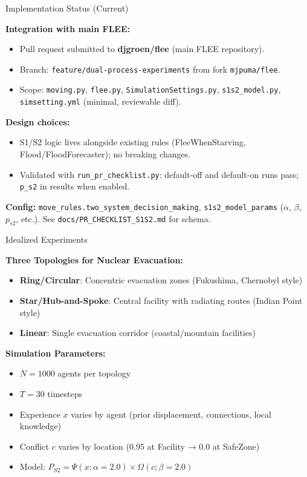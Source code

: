 \documentclass[aspectratio=169]{beamer}
\begin{document}
\begin{frame}{Implementation Status (Current)}

\textbf{Integration with main FLEE:}
\begin{itemize}
    \item Pull request submitted to \textbf{djgroen/flee} (main FLEE repository).
    \item Branch: \texttt{feature/dual-process-experiments} from fork \texttt{mjpuma/flee}.
    \item Scope: \texttt{moving.py}, \texttt{flee.py}, \texttt{SimulationSettings.py}, \texttt{s1s2\_model.py}, \texttt{simsetting.yml} (minimal, reviewable diff).
\end{itemize}

\vspace{0.5em}

\textbf{Design choices:}
\begin{itemize}
    \item S1/S2 logic lives alongside existing rules (FleeWhenStarving, Flood/FloodForecaster); no breaking changes.
    \item Validated with \texttt{run\_pr\_checklist.py}: default-off and default-on runs pass; \texttt{p\_s2} in results when enabled.
\end{itemize}

\vspace{0.5em}

\textbf{Config:} \texttt{move\_rules.two\_system\_decision\_making}, \texttt{s1s2\_model\_params} ($\alpha$, $\beta$, $p_{s2}$, etc.). See \texttt{docs/PR\_CHECKLIST\_S1S2.md} for schema.

\end{frame}

\begin{frame}{Idealized Experiments}

\textbf{Three Topologies for Nuclear Evacuation:}
\begin{itemize}
    \item \textbf{Ring/Circular}: Concentric evacuation zones (Fukushima, Chernobyl style)
    \item \textbf{Star/Hub-and-Spoke}: Central facility with radiating routes (Indian Point style)
    \item \textbf{Linear}: Single evacuation corridor (coastal/mountain facilities)
\end{itemize}

\vspace{0.5em}

\textbf{Simulation Parameters:}
\begin{itemize}
    \item $N=1000$ agents per topology
    \item $T=30$ timesteps
    \item Experience $x$ varies by agent (prior displacement, connections, local knowledge)
    \item Conflict $c$ varies by location (0.95 at Facility → 0.0 at SafeZone)
    \item Model: $P_{S2} = \Psi(x; \alpha=2.0) \times \Omega(c; \beta=2.0)$
\end{itemize}

\end{frame}
\end{document}
